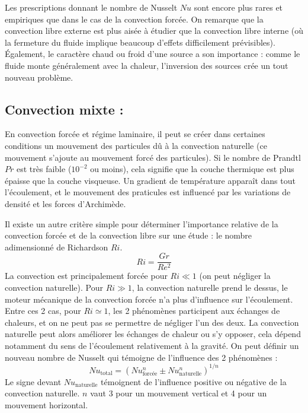 Les prescriptions donnant le nombre de Nusselt $Nu$ sont encore plus rares et empiriques que dans le cas de la convection forcée. On remarque que la convection libre externe est plus aisée à étudier que la convection libre interne (où la fermeture du fluide implique beaucoup d'effets difficilement prévisibles). Également, le caractère chaud ou froid d'une source a son importance : comme le fluide monte généralement avec la chaleur, l'inversion des sources crée un tout nouveau problème.


\subsection{Convection mixte :}

En convection forcée et régime laminaire, il peut se créer dans certaines conditions un mouvement des particules dû à la convection naturelle (ce mouvement s'ajoute au mouvement forcé des particules). Si le nombre de Prandtl $Pr$ est très faible ($10^{-2}$ ou moins), cela signifie que la couche thermique est plus épaisse que la couche visqueuse. Un gradient de température apparaît dans tout l'écoulement, et le mouvement des praticules est influencé par les variations de densité et les forces d'Archimède.

Il existe un autre critère simple pour déterminer l'importance relative de la convection forcée et de la convection libre sur une étude : le nombre adimensionné de Richardson $Ri$.
%
\begin{equation}
    Ri = \frac{Gr}{Re^2}
\end{equation}
%
La convection est principalement forcée pour $Ri \ll 1$ (on peut négliger la convection naturelle). Pour $Ri \gg 1$, la convection naturelle prend le dessus, le moteur mécanique de la convection forcée n'a plus d'influence sur l'écoulement. Entre ces 2 cas, pour $Ri \simeq 1$, les 2 phénomènes participent aux échanges de chaleurs, et on ne peut pas se permettre de négliger l'un des deux. La convection naturelle peut alors améliorer les échanges de chaleur ou s'y opposer, cela dépend notamment du sens de l'écoulement relativement à la gravité. On peut définir un nouveau nombre de Nusselt qui témoigne de l'influence des 2 phénomènes :
%
\begin{equation}
    Nu_{\text{total}} = \left( Nu_{\text{forcée}}^n \pm Nu_{\text{naturelle}}^n \right)^{1/n}
\end{equation}
%
Le signe devant $Nu_{\text{naturelle}}$ témoignent de l'influence positive ou négative de la convection naturelle. $n$ vaut 3 pour un mouvement vertical et 4 pour un mouvement horizontal.

